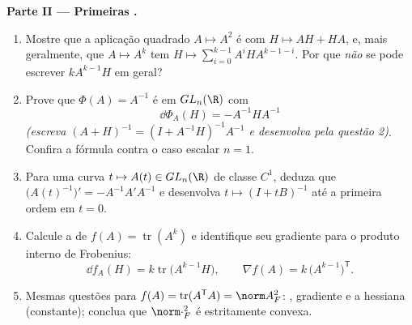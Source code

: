 \begin{problem}
\medskip
\noindent\textbf{Parte II --- Primeiras .}
\begin{enumerate}[resume]
  \item Mostre que a aplicação quadrado $A \mapsto A^2$ é
         com  $H \mapsto AH + HA$,
        e, mais geralmente, que $A \mapsto A^k$ tem
         $H \mapsto \sum_{i=0}^{k-1}
        A^iHA^{k-1-i}$. Por que \emph{não} se pode escrever $kA^{k-1}H$
        em geral?
  \item Prove que $\Phi(A) = A^{-1}$ é  em
        $GL_n(\R)$ com
        \[
        \dd\Phi_A(H) = -A^{-1}HA^{-1}
        \]
        \emph{(escreva $(A + H)^{-1} = (I + A^{-1}H)^{-1}A^{-1}$
        e desenvolva pela questão 2)}. Confira a fórmula contra
        o caso escalar $n = 1$.
  \item Para uma curva $t \mapsto A(t) \in GL_n(\R)$ de classe $C^1$, deduza que
        $\bigl(A(t)^{-1}\bigr)' = -A^{-1}A'A^{-1}$ e desenvolva
        $t \mapsto (I + tB)^{-1}$ até a primeira ordem em $t = 0$.
  \item Calcule a  de $f(A) =
        \operatorname{tr}(A^k)$ e identifique seu gradiente para
        o produto interno de Frobenius:
        \[
        \dd f_A(H) = k\operatorname{tr}\bigl(A^{k-1}H\bigr),
        \qquad
        \nabla f(A) = k\,\bigl(A^{k-1}\bigr)^{\mathsf T} .
        \]
  \item Mesmas questões para $f(A) = \operatorname{tr}
        (A^{\mathsf T}A) = \norm A_F^2$: ,
        gradiente e a hessiana (constante); conclua que
        $\norm\cdot_F^2$ é estritamente convexa.
\end{enumerate}


\end{problem}
